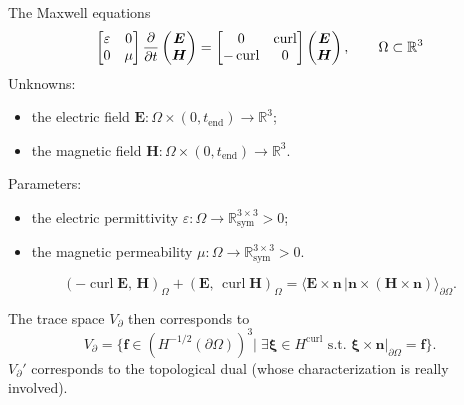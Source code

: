 \documentclass[aspectratio=169]{beamer}
\DeclareMathOperator*{\curl}{curl}
\newcommand{\bbR}{\mathbb{R}}
\newcommand{\inner}[3][]{\ensuremath{( #2, \, #3 )_{#1}}}
\newcommand{\dualpr}[3][]{\ensuremath{\langle #2 \, \vert #3 \rangle_{#1}}}
\begin{document}
\begin{frame}{The Maxwell equations}
	\begin{equation*}
		\begin{bmatrix}
			\varepsilon & 0 \\
			0 & \mu
		\end{bmatrix}\diffp{}{t}\begin{pmatrix}
			\bm{E} \\ \bm{H} 
		\end{pmatrix} = 
		\begin{bmatrix}
			0 & \curl \\
			-\curl & 0 \\
		\end{bmatrix}\begin{pmatrix}
			\bm{E} \\ \bm{H}
		\end{pmatrix},  \qquad \Omega \subset \bbR^3
	\end{equation*}
	Unknowns:
\begin{itemize}
	\item the electric field $\bm{E} : \Omega \times (0, t_{\mathrm{end}}) \rightarrow \bbR^3$;
	\item the magnetic field $\bm{H} : \Omega \times (0, t_{\mathrm{end}}) \rightarrow \bbR^3$.
\end{itemize}
Parameters:
\begin{itemize}
	\item the electric permittivity $\varepsilon: \Omega \rightarrow \bbR^{3\times 3}_{\text{sym}}>0$;
	\item the magnetic permeability $\mu:\Omega \rightarrow \bbR^{3\times 3}_{\text{sym}} > 0$.
\end{itemize}
	\begin{equation*}
		\inner[\Omega]{-\curl \bm{E}}{\bm{H}} + \inner[\Omega]{\bm{E}}{\curl \bm{H}} = \dualpr[\partial\Omega]{\bm{E} \times \bm{n}}{\bm{n} \times (\bm{H} \times \bm{n})}.
	\end{equation*}

	The trace space $V_\partial$ then corresponds to
	\begin{equation*}
		V_\partial = \{\bm{f} \in (H^{-1/2}(\partial\Omega))^3 \vert \; \exists \bm{\xi} \in H^{\curl} \text{ s.t. } \bm{\xi}\times \bm{n}\vert_{\partial\Omega} = \bm{f}\}.
	\end{equation*}
	$V_\partial'$ corresponds to the topological dual (whose characterization is really involved). 
\end{frame}
\end{document}
